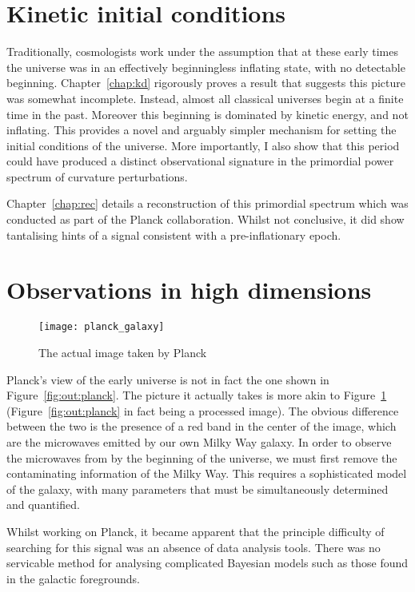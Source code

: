 \section{Kinetic initial conditions}

Traditionally, cosmologists work under the assumption that at these early times the universe was in an effectively beginningless inflating state, with no detectable beginning. Chapter~\ref{chap:kd} rigorously proves a result that suggests this picture was somewhat incomplete.  Instead, almost all classical universes begin at a finite time in the past.  Moreover this beginning is dominated by kinetic energy, and not inflating. This provides a novel and arguably simpler mechanism for setting the initial conditions of the universe. More importantly, I also show that this period could have produced a distinct observational signature in the primordial power spectrum of curvature perturbations.

Chapter~\ref{chap:rec} details a reconstruction of this primordial spectrum which was conducted as part of the Planck collaboration. Whilst not conclusive, it did show tantalising hints of a signal consistent with a pre-inflationary epoch.

\section{Observations in high dimensions}
\begin{figure}
  \texttt{[image: planck\_galaxy]}
  \caption{The actual image taken by Planck}\label{fig:out:planck_galaxy}
\end{figure}
Planck's view of the early universe is not in fact the one shown in Figure~\ref{fig:out:planck}. The picture it actually takes is more akin to Figure~\ref{fig:out:planck_galaxy} (Figure~\ref{fig:out:planck} in fact being a processed image). The obvious difference between the two is the presence of a red band in the center of the image, which are the microwaves emitted by our own Milky Way galaxy. In order to observe the microwaves from by the beginning of the universe, we must first remove the contaminating information of the Milky Way. This requires a sophisticated model of the galaxy, with many parameters that must be simultaneously determined and quantified. 

Whilst working on Planck, it became apparent that the principle difficulty of searching for this signal was an absence of data analysis tools. There was no servicable method for analysing complicated Bayesian models such as those found in the galactic foregrounds.

